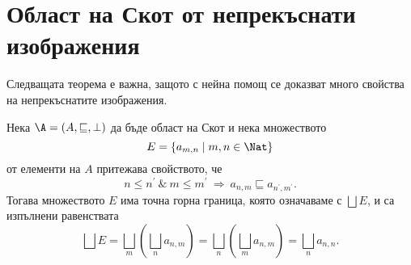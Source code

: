 \section{Област на Скот от непрекъснати изображения}

Следващата теорема е важна, защото с нейна помощ се доказват много свойства на непрекъснатите изображения.

\begin{theorem}
  \label{th:double-chain}
  Нека $\A = (A,\sqsubseteq,\bot)$ да бъде област на Скот и нека множеството 
  \[E = \{a_{m,n} \mid m,n \in \Nat\}\]
  от елементи на $A$ притежава свойството, че 
  \[n \leq n^\prime\ \&\ m \leq m^\prime\ \Rightarrow\ a_{n,m} \sqsubseteq a_{n^\prime,m^\prime}.\]
  Тогава множеството $E$ има точна горна граница, която означаваме с $\bigsqcup E$, и са изпълнени равенствата
  \[\bigsqcup E = \bigsqcup_m(\bigsqcup_n a_{n,m}) = \bigsqcup_n(\bigsqcup_{m} a_{n,m}) = \bigsqcup_n a_{n,n}.\]
\end{theorem}
